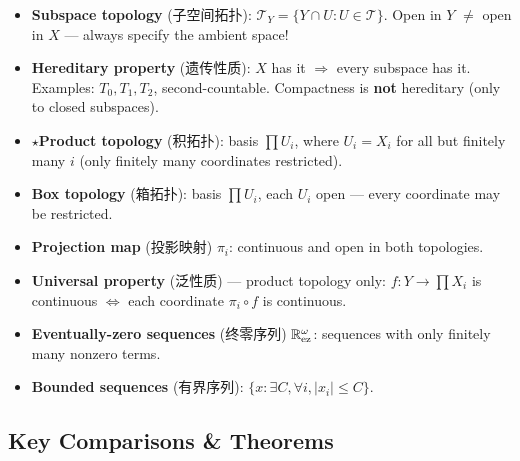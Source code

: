 \documentclass{article}
\newcommand{\starKey}{\textcolor{red!65!black}{\textbf{$\star$}}}
\begin{document}
\begin{itemize}
  \item \textbf{Subspace topology} (子空间拓扑): $\mathcal{T}_Y=\{Y\cap U:U\in\mathcal{T}\}$.
  Open in $Y$ $\neq$ open in $X$ --- always specify the ambient space!
  \item \textbf{Hereditary property} (遗传性质): $X$ has it $\Rightarrow$ every subspace has it.
  Examples: $T_0,T_1,T_2$, second-countable.
  Compactness is \textbf{not} hereditary (only to closed subspaces).
  \item \starKey \textbf{Product topology} (积拓扑): basis $\prod U_i$,
  where $U_i=X_i$ for all but finitely many $i$ (only finitely many coordinates restricted).
  \item \textbf{Box topology} (箱拓扑): basis $\prod U_i$,
  each $U_i$ open --- every coordinate may be restricted.
  \item \textbf{Projection map} (投影映射) $\pi_i$: continuous and open in both topologies.
  \item \textbf{Universal property} (泛性质) --- product topology only:
  $f:Y\to\prod X_i$ is continuous $\iff$ each coordinate $\pi_i\circ f$ is continuous.
  \item \textbf{Eventually-zero sequences} (终零序列) $\mathbb{R}^\omega_{\mathrm{ez}}$:
  sequences with only finitely many nonzero terms.
  \item \textbf{Bounded sequences} (有界序列): $\{x:\exists C,\forall i,|x_i|\le C\}$.
\end{itemize}

\subsection{Key Comparisons \& Theorems}
\end{document}
